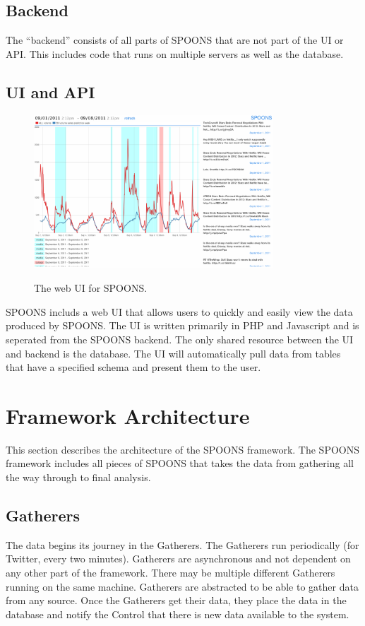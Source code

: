 \documentclass[12pt]{ucthesis}
\newcommand{\captionfonts}{\small\bf\ssp}
\begin{document}
\subsection{Backend}
\label{arch-backend}
The ``backend'' consists of all parts of SPOONS that are not part of the UI or API.
This includes code that runs on multiple servers as well as the database.

\subsection{UI and API}
\label{arch-ui}
\begin{figure}
   \begin{center}
      \includegraphics[width=0.8\textwidth]{images/ui.eps}
      \captionfonts
      \caption[SPOONS UI]{The web UI for SPOONS.}
      \label{fig:ui}
   \end{center}
\end{figure}

SPOONS includs a web UI that allows users to quickly and easily view the data produced by SPOONS.
The UI is written primarily in PHP and Javascript and is seperated from the SPOONS backend.
The only shared resource between the UI and backend is the database. The UI will automatically pull
data from tables that have a specified schema and present them to the user.

\section{Framework Architecture}
\label{arch-framework-arch}
This section describes the architecture of the SPOONS framework. The SPOONS framework includes all pieces of SPOONS
that takes the data from gathering all the way through to final analysis.

\subsection{Gatherers}
\label{arch-gatherers}
The data begins its journey in the Gatherers. The Gatherers run periodically (for Twitter, every two minutes).
Gatherers are asynchronous and not dependent on any other part of the framework. There may be multiple different
Gatherers running on the same machine. Gatherers are abstracted to be able to gather data from any source.
Once the Gatherers get their data, they place the data in the database and notify the Control that there is new data
available to the system.
\end{document}
